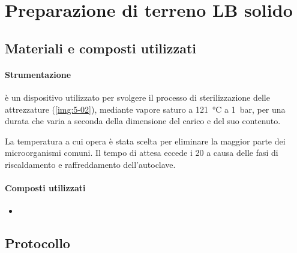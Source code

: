 \section{Preparazione di terreno LB solido}
\subsection{Materiali e composti utilizzati}
\paragraph{Strumentazione}
\begin{itemize}
	\itemb[Autoclave:] è un dispositivo utilizzato per svolgere il processo di sterilizzazione delle attrezzature (\autoref{img:5-02}), mediante vapore saturo a \qty{121}{\celsius} a \qty{1}{\bar}, per una durata che varia a seconda della dimensione del carico e del suo contenuto.
	
	La temperatura a cui opera è stata scelta per eliminare la maggior parte dei microorganismi comuni. Il tempo di attesa eccede i \qty{20}{\min} a causa delle fasi di riscaldamento e raffreddamento dell’autoclave.
\end{itemize}

\paragraph{Composti utilizzati}
\begin{itemize}
	\item
\end{itemize}

\subsection{Protocollo}
